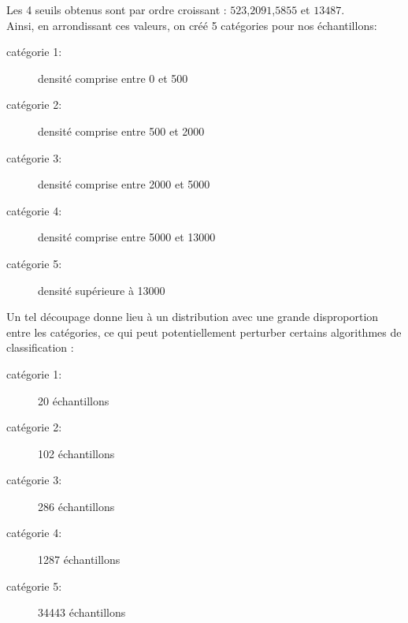 \documentclass{book}
\begin{document}
Les 4 seuils obtenus sont par ordre croissant : $523$,$2091$,$5855$ et $13487$.\\
Ainsi, en arrondissant ces valeurs, on créé 5 catégories pour nos échantillons:\\
\begin{description}
 \item[catégorie 1:] densité comprise entre 0 et 500
 \item[catégorie 2:] densité comprise entre 500 et 2000
 \item[catégorie 3:] densité comprise entre 2000 et 5000
 \item[catégorie 4:] densité comprise entre 5000 et 13000
 \item[catégorie 5:] densité supérieure à 13000 
\end{description}
\clearpage

Un tel découpage donne lieu à un distribution avec une grande disproportion entre les catégories, ce qui peut potentiellement perturber certains algorithmes de classification :\\
\begin{description}
 \item[catégorie 1:] 20 échantillons
 \item[catégorie 2:] 102 échantillons
 \item[catégorie 3:] 286 échantillons
 \item[catégorie 4:] 1287 échantillons
 \item[catégorie 5:] 34443 échantillons
\end{description}
\end{document}
